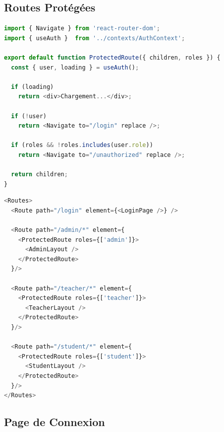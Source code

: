\documentclass[12pt,a4paper,oneside]{report}
\begin{document}
\subsection{Routes Protégées}

\begin{lstlisting}[language=JavaScript,
  caption=components/ProtectedRoute.jsx --- Garde de route par role]
import { Navigate } from 'react-router-dom';
import { useAuth }  from '../contexts/AuthContext';

export default function ProtectedRoute({ children, roles }) {
  const { user, loading } = useAuth();

  if (loading)
    return <div>Chargement...</div>;

  if (!user)
    return <Navigate to="/login" replace />;

  if (roles && !roles.includes(user.role))
    return <Navigate to="/unauthorized" replace />;

  return children;
}
\end{lstlisting}

\begin{lstlisting}[language=JavaScript,
  caption=App.jsx --- Routes protegees par role]
<Routes>
  <Route path="/login" element={<LoginPage />} />

  <Route path="/admin/*" element={
    <ProtectedRoute roles={['admin']}>
      <AdminLayout />
    </ProtectedRoute>
  }/>

  <Route path="/teacher/*" element={
    <ProtectedRoute roles={['teacher']}>
      <TeacherLayout />
    </ProtectedRoute>
  }/>

  <Route path="/student/*" element={
    <ProtectedRoute roles={['student']}>
      <StudentLayout />
    </ProtectedRoute>
  }/>
</Routes>
\end{lstlisting}

\subsection{Page de Connexion}
\end{document}
